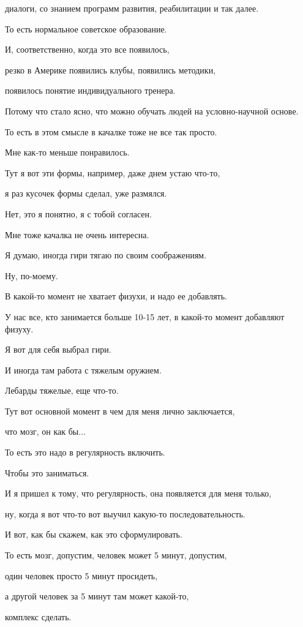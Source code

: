 
диалоги, со знанием программ развития, реабилитации и так далее.

То есть нормальное советское образование.

И, соответственно, когда это все появилось,

резко в Америке появились клубы, появились методики,

появилось понятие индивидуального тренера.

Потому что стало ясно, что можно обучать людей на условно-научной основе.

То есть в этом смысле в качалке тоже не все так просто.

Мне как-то меньше понравилось.

Тут я вот эти формы, например, даже днем устаю что-то,

я раз кусочек формы сделал, уже размялся.

Нет, это я понятно, я с тобой согласен.

Мне тоже качалка не очень интересна.

Я думаю, иногда гири тягаю по своим соображениям.

Ну, по-моему.

В какой-то момент не хватает физухи, и надо ее добавлять.

У нас все, кто занимается больше 10-15 лет, в какой-то момент добавляют физуху.

Я вот для себя выбрал гири.

И иногда там работа с тяжелым оружием.

Лебарды тяжелые, еще что-то.

Тут вот основной момент в чем для меня лично заключается,

что мозг, он как бы...

То есть это надо в регулярность включить.

Чтобы это заниматься.

И я пришел к тому, что регулярность, она появляется для меня только,

ну, когда я вот что-то вот выучил какую-то последовательность.

И вот, как бы скажем, как это сформулировать.

То есть мозг, допустим, человек может 5 минут, допустим,

один человек просто 5 минут просидеть,

а другой человек за 5 минут там может какой-то,

комплекс сделать.

